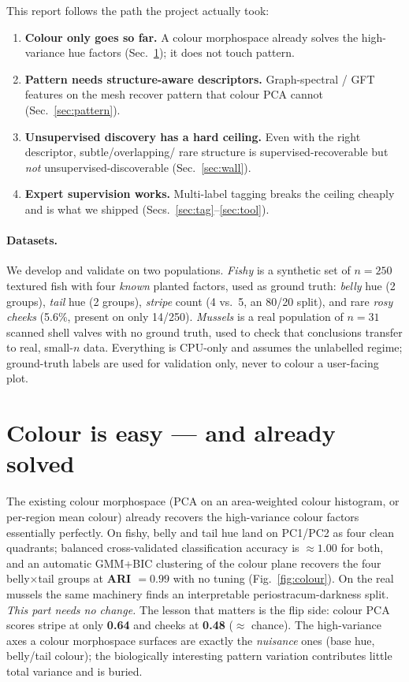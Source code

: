 \documentclass[11pt]{article}
\newcommand{\acc}[1]{\textbf{#1}}
\begin{document}
This report follows the path the project actually took:
\begin{enumerate}
  \item \textbf{Colour only goes so far.} A colour morphospace already solves the high-variance hue factors
  (Sec.~\ref{sec:colour}); it does not touch pattern.
  \item \textbf{Pattern needs structure-aware descriptors.} Graph-spectral / GFT features on the mesh recover
  pattern that colour PCA cannot (Sec.~\ref{sec:pattern}).
  \item \textbf{Unsupervised discovery has a hard ceiling.} Even with the right descriptor, subtle/overlapping/
  rare structure is supervised-recoverable but \emph{not} unsupervised-discoverable (Sec.~\ref{sec:wall}).
  \item \textbf{Expert supervision works.} Multi-label tagging breaks the ceiling cheaply and is what we
  shipped (Secs.~\ref{sec:tag}--\ref{sec:tool}).
\end{enumerate}

\paragraph{Datasets.} We develop and validate on two populations. \emph{Fishy} is a synthetic set of
$n{=}250$ textured fish with four \emph{known} planted factors, used as ground truth: \emph{belly} hue (2
groups), \emph{tail} hue (2 groups), \emph{stripe} count (4 vs.\ 5, an 80/20 split), and rare \emph{rosy
cheeks} (5.6\%, present on only 14/250). \emph{Mussels} is a real population of $n{=}31$ scanned shell valves
with no ground truth, used to check that conclusions transfer to real, small-$n$ data. Everything is CPU-only
and assumes the unlabelled regime; ground-truth labels are used for validation only, never to colour a
user-facing plot.

\section{Colour is easy --- and already solved}
\label{sec:colour}

The existing colour morphospace (PCA on an area-weighted colour histogram, or per-region mean colour) already
recovers the high-variance colour factors essentially perfectly. On fishy, belly and tail hue land on PC1/PC2
as four clean quadrants; balanced cross-validated classification accuracy is $\approx\!1.00$ for both, and an
automatic GMM+BIC clustering of the colour plane recovers the four belly$\times$tail groups at
\acc{ARI $=0.99$} with no tuning (Fig.~\ref{fig:colour}). On the real mussels the same machinery finds an
interpretable periostracum-darkness split. \emph{This part needs no change.} The lesson that matters is the
flip side: colour PCA scores stripe at only \acc{0.64} and cheeks at \acc{0.48} ($\approx$ chance). The
high-variance axes a colour morphospace surfaces are exactly the \emph{nuisance} ones (base hue, belly/tail
colour); the biologically interesting pattern variation contributes little total variance and is buried.
\end{document}
